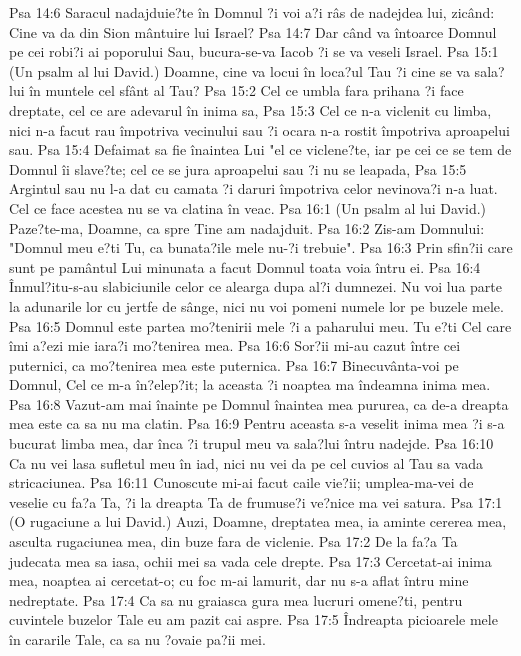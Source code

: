 Psa 14:6  Saracul nadajduie?te în Domnul ?i voi a?i râs de nadejdea lui, zicând: Cine va da din Sion mântuire lui Israel?
Psa 14:7  Dar când va întoarce Domnul pe cei robi?i ai poporului Sau, bucura-se-va Iacob ?i se va veseli Israel.
Psa 15:1  (Un psalm al lui David.) Doamne, cine va locui în loca?ul Tau ?i cine se va sala?lui în muntele cel sfânt al Tau?
Psa 15:2  Cel ce umbla fara prihana ?i face dreptate, cel ce are adevarul în inima sa,
Psa 15:3  Cel ce n-a viclenit cu limba, nici n-a facut rau împotriva vecinului sau ?i ocara n-a rostit împotriva aproapelui sau.
Psa 15:4  Defaimat sa fie înaintea Lui "el ce viclene?te, iar pe cei ce se tem de Domnul îi slave?te; cel ce se jura aproapelui sau ?i nu se leapada,
Psa 15:5  Argintul sau nu l-a dat cu camata ?i daruri împotriva celor nevinova?i n-a luat. Cel ce face acestea nu se va clatina în veac.
Psa 16:1  (Un psalm al lui David.) Paze?te-ma, Doamne, ca spre Tine am nadajduit.
Psa 16:2  Zis-am Domnului: "Domnul meu e?ti Tu, ca bunata?ile mele nu-?i trebuie".
Psa 16:3  Prin sfin?ii care sunt pe pamântul Lui minunata a facut Domnul toata voia întru ei.
Psa 16:4  Înmul?itu-s-au slabiciunile celor ce alearga dupa al?i dumnezei. Nu voi lua parte la adunarile lor cu jertfe de sânge, nici nu voi pomeni numele lor pe buzele mele.
Psa 16:5  Domnul este partea mo?tenirii mele ?i a paharului meu. Tu e?ti Cel care îmi a?ezi mie iara?i mo?tenirea mea.
Psa 16:6  Sor?ii mi-au cazut între cei puternici, ca mo?tenirea mea este puternica.
Psa 16:7  Binecuvânta-voi pe Domnul, Cel ce m-a în?elep?it; la aceasta ?i noaptea ma îndeamna inima mea.
Psa 16:8  Vazut-am mai înainte pe Domnul înaintea mea pururea, ca de-a dreapta mea este ca sa nu ma clatin.
Psa 16:9  Pentru aceasta s-a veselit inima mea ?i s-a bucurat limba mea, dar înca ?i trupul meu va sala?lui întru nadejde.
Psa 16:10  Ca nu vei lasa sufletul meu în iad, nici nu vei da pe cel cuvios al Tau sa vada stricaciunea.
Psa 16:11  Cunoscute mi-ai facut caile vie?ii; umplea-ma-vei de veselie cu fa?a Ta, ?i la dreapta Ta de frumuse?i ve?nice ma vei satura.
Psa 17:1  (O rugaciune a lui David.) Auzi, Doamne, dreptatea mea, ia aminte cererea mea, asculta rugaciunea mea, din buze fara de viclenie.
Psa 17:2  De la fa?a Ta judecata mea sa iasa, ochii mei sa vada cele drepte.
Psa 17:3  Cercetat-ai inima mea, noaptea ai cercetat-o; cu foc m-ai lamurit, dar nu s-a aflat întru mine nedreptate.
Psa 17:4  Ca sa nu graiasca gura mea lucruri omene?ti, pentru cuvintele buzelor Tale eu am pazit cai aspre.
Psa 17:5  Îndreapta picioarele mele în cararile Tale, ca sa nu ?ovaie pa?ii mei.
